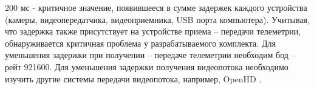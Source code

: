 200 мс - критичное значение, появившееся в сумме задержек каждого устройства (камеры, видеопередатчика, видеоприемника, USB порта компьютера). Учитывая, что задержка также присутствует на устройстве приема -- передачи телеметрии, обнаруживается критичная проблема у разрабатываемого комплекта. Для уменьшения задержки при получении -- передаче телеметрии необходим бод -- рейт 921600. Для уменьшения задержки получения видеопотока необходимо изучить другие системы передачи видеопотока, например, OpenHD \cite{openhd}.

